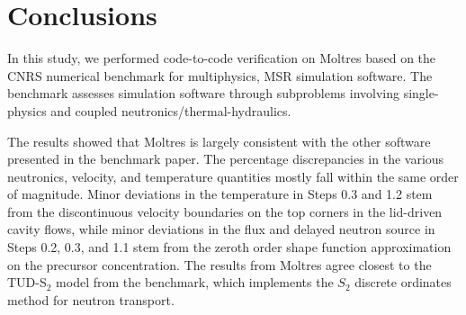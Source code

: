 \section{Conclusions}

In this study, we performed code-to-code verification on Moltres based on the
CNRS numerical benchmark \cite{tiberga_results_2020} for multiphysics,
\gls{MSR} simulation software. The benchmark assesses simulation
software through subproblems involving single-physics and coupled
neutronics/thermal-hydraulics.

The results showed that Moltres is largely consistent with the other software
presented in the benchmark paper. The percentage discrepancies in the various
neutronics, velocity, and temperature quantities mostly fall within the same
order of magnitude. Minor deviations in the temperature in Steps 0.3 and 1.2 
stem from the discontinuous velocity
boundaries on the top corners in the lid-driven cavity flows, while minor
deviations in the flux and delayed neutron source in Steps 0.2, 0.3, and 1.1
stem from the zeroth order shape function approximation on the precursor
concentration. The results from Moltres agree closest to the TUD-S$_2$ model
from the benchmark, which implements the $S_2$ discrete ordinates method for
neutron transport.
